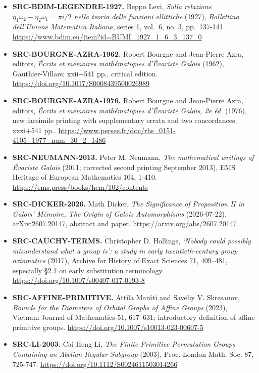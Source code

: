 \documentclass[
  10pt,
  a4paper,
]{scrreprt}
\begin{document}
\begin{itemize}
  Functions, \emph{DLMF §19.7(i), Legendre's Relation} (current
  reference), Equation 19.7.1, §19.7(i).
  \url{https://dlmf.nist.gov/19.7.E1}
\item
  \textbf{SRC-BDIM-LEGENDRE-1927.} Beppo Levi, \emph{Sulla relazione
  \(\eta_1\omega_2-\eta_2\omega_1=\pi i/2\) nella teoria delle funzioni
  ellittiche} (1927), \emph{Bollettino dell'Unione Matematica Italiana},
  series 1, vol.~6, no. 3, pp.~137-141.
  \url{https://www.bdim.eu/item?id=BUMI_1927_1_6_3_137_0}
\item
  \textbf{SRC-BOURGNE-AZRA-1962.} Robert Bourgne and Jean-Pierre Azra,
  editors, \emph{Écrits et mémoires mathématiques d'Évariste Galois}
  (1962), Gauthier-Villars; xxii+541 pp., critical edition.
  \url{https://doi.org/10.1017/S0008439500026989}
\item
  \textbf{SRC-BOURGNE-AZRA-1976.} Robert Bourgne and Jean-Pierre Azra,
  editors, \emph{Écrits et mémoires mathématiques d'Évariste Galois, 2e
  éd.} (1976), new facsimile printing with supplementary errata and two
  concordances, xxxi+541 pp..
  \url{https://www.persee.fr/doc/rhs_0151-4105_1977_num_30_2_1486}
\item
  \textbf{SRC-NEUMANN-2013.} Peter M. Neumann, \emph{The mathematical
  writings of Évariste Galois} (2011; corrected second printing
  September 2013), EMS Heritage of European Mathematics 104, 1-410.
  \url{https://ems.press/books/hem/102/contents}
\item
  \textbf{SRC-DICKER-2026.} Math Dicker, \emph{The Significance of
  Proposition II in Galois' Mémoire, The Origin of Galois Automorphisms}
  (2026-07-22), arXiv:2607.20147, abstract and paper.
  \url{https://arxiv.org/abs/2607.20147}
\item
  \textbf{SRC-CAUCHY-TERMS.} Christopher D. Hollings, \emph{`Nobody
  could possibly misunderstand what a group is': a study in early
  twentieth-century group axiomatics} (2017), Archive for History of
  Exact Sciences 71, 409--481, especially §2.1 on early substitution
  terminology. \url{https://doi.org/10.1007/s00407-017-0193-8}
\item
  \textbf{SRC-AFFINE-PRIMITIVE.} Attila Maróti and Saveliy V. Skresanov,
  \emph{Bounds for the Diameters of Orbital Graphs of Affine Groups}
  (2023), Vietnam Journal of Mathematics 51, 617--631; introductory
  definition of affine primitive groups.
  \url{https://doi.org/10.1007/s10013-023-00607-5}
\item
  \textbf{SRC-LI-2003.} Cai Heng Li, \emph{The Finite Primitive
  Permutation Groups Containing an Abelian Regular Subgroup} (2003),
  Proc. London Math. Soc. 87, 725-747.
  \url{https://doi.org/10.1112/S0024611503014266}
\end{itemize}
\end{document}
